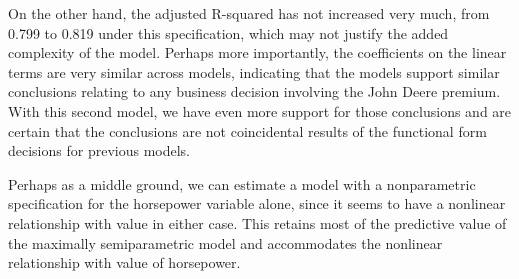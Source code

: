 \documentclass[11pt]{paper}
\begin{document}


On the other hand, 
the adjusted R-squared has not increased very much, 
from 0.799 to 0.819 under this specification, 
which may not justify the added complexity of the model.
Perhaps more importantly, the coefficients on the 
linear terms are very similar across models, 
indicating that the models support similar conclusions relating to any business decision involving
the John Deere premium. 
With this second model, we have even more support for those conclusions
and are certain that the conclusions are not 
coincidental results of the
functional form decisions for previous models.


Perhaps as a middle ground, we can estimate a model with a 
nonparametric specification for the horsepower variable alone, 
since it seems to have a nonlinear relationship with value in either case. 
This retains most of the predictive value of the maximally 
semiparametric model and accommodates the 
nonlinear relationship with value of horsepower. 





\end{document}
